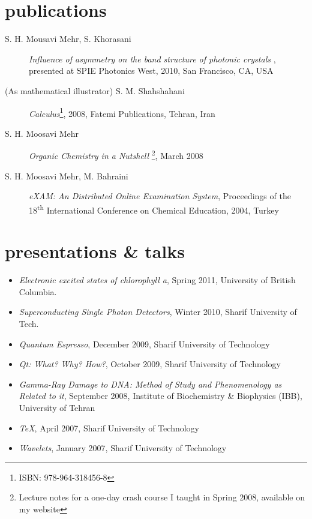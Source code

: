 \documentclass[overlapped,line,10pt,letterpaper]{res}
\begin{document}
\begin{resume}
\section{publications}
\begin{description}
\item[S. H. Mousavi Mehr, S. Khorasani] \emph{Influence of asymmetry on the band structure of photonic crystals }, presented at SPIE Photonics West, 2010, San Francisco, CA, USA
\item [(As mathematical illustrator) S. M. Shahshahani] \emph{Calculus}\footnote{ ISBN: 978-964-318456-8}, 2008, Fatemi Publications, Tehran, Iran
\item[S. H. Moosavi Mehr] \emph{Organic Chemistry in a Nutshell} \footnote{Lecture notes for a one-day crash course I taught in Spring 2008, available on my website}, March 2008
\item[S. H. Moosavi Mehr, M. Bahraini] \emph{eXAM: An Distributed Online Examination System}, Proceedings of the 18\textsuperscript{th} International Conference on Chemical Education, 2004, Turkey
\end{description}

\section{presentations \& talks}
\begin{itemize}
\item \emph{Electronic excited states of chlorophyll a}, Spring 2011, University of British Columbia.
\item \emph{Superconducting Single Photon Detectors}, Winter 2010, Sharif University of Tech.
\item \emph{Quantum Espresso}, December 2009, Sharif  University of Technology
\item \emph{Qt: What? Why? How?}, October 2009, Sharif University of Technology
\item \emph{Gamma-Ray Damage to DNA: Method of Study and Phenomenology as Related to it}, September 2008, Institute of Biochemistry \& Biophysics (IBB), University of Tehran
\item \emph{\TeX}, April 2007, Sharif University of Technology
\item \emph{Wavelets}, January 2007, Sharif University of Technology
\end{itemize}


\end{resume}
\end{document}
